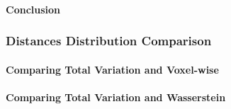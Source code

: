 \paragraph{Conclusion}

\subsubsection{Distances Distribution Comparison}

\paragraph{Comparing Total Variation and Voxel-wise}

\paragraph{Comparing Total Variation and Wasserstein}



